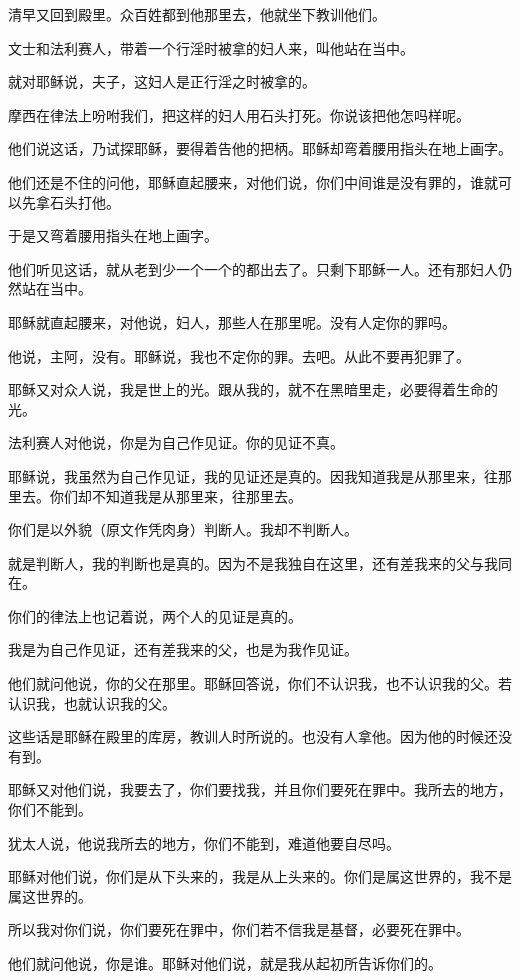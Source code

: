 \documentclass[12pt,oneside]{book}
\begin{document}
清早又回到殿里。众百姓都到他那里去，他就坐下教训他们。

文士和法利赛人，带着一个行淫时被拿的妇人来，叫他站在当中。

就对耶稣说，夫子，这妇人是正行淫之时被拿的。

摩西在律法上吩咐我们，把这样的妇人用石头打死。你说该把他怎吗样呢。

他们说这话，乃试探耶稣，要得着告他的把柄。耶稣却弯着腰用指头在地上画字。

他们还是不住的问他，耶稣直起腰来，对他们说，你们中间谁是没有罪的，谁就可以先拿石头打他。

于是又弯着腰用指头在地上画字。

他们听见这话，就从老到少一个一个的都出去了。只剩下耶稣一人。还有那妇人仍然站在当中。

耶稣就直起腰来，对他说，妇人，那些人在那里呢。没有人定你的罪吗。

他说，主阿，没有。耶稣说，我也不定你的罪。去吧。从此不要再犯罪了。

耶稣又对众人说，我是世上的光。跟从我的，就不在黑暗里走，必要得着生命的光。

法利赛人对他说，你是为自己作见证。你的见证不真。

耶稣说，我虽然为自己作见证，我的见证还是真的。因我知道我是从那里来，往那里去。你们却不知道我是从那里来，往那里去。

你们是以外貌（原文作凭肉身）判断人。我却不判断人。

就是判断人，我的判断也是真的。因为不是我独自在这里，还有差我来的父与我同在。

你们的律法上也记着说，两个人的见证是真的。

我是为自己作见证，还有差我来的父，也是为我作见证。

他们就问他说，你的父在那里。耶稣回答说，你们不认识我，也不认识我的父。若认识我，也就认识我的父。

这些话是耶稣在殿里的库房，教训人时所说的。也没有人拿他。因为他的时候还没有到。

耶稣又对他们说，我要去了，你们要找我，并且你们要死在罪中。我所去的地方，你们不能到。

犹太人说，他说我所去的地方，你们不能到，难道他要自尽吗。

耶稣对他们说，你们是从下头来的，我是从上头来的。你们是属这世界的，我不是属这世界的。

所以我对你们说，你们要死在罪中，你们若不信我是基督，必要死在罪中。

他们就问他说，你是谁。耶稣对他们说，就是我从起初所告诉你们的。
\end{document}
